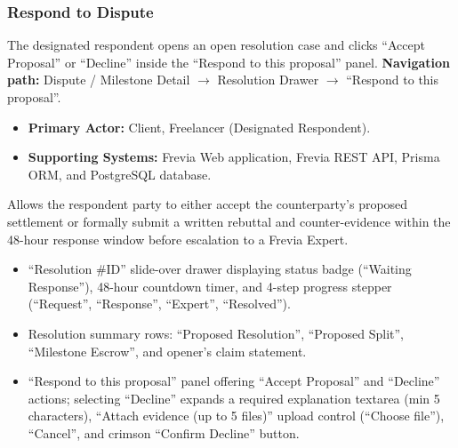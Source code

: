 \subsubsection{ Respond to Dispute}

The designated respondent opens an open resolution case and clicks ``Accept Proposal'' or ``Decline'' inside the ``Respond to this proposal'' panel.\newline
\textbf{Navigation path:} Dispute / Milestone Detail $\rightarrow$ Resolution Drawer $\rightarrow$ ``Respond to this proposal''.


\begin{itemize}[leftmargin=1.6em,topsep=3pt,itemsep=2pt,parsep=0pt,label=$\bullet$]
      \item \textbf{Primary Actor:} Client, Freelancer (Designated Respondent).
      \item \textbf{Supporting Systems:} Frevia Web application, Frevia REST API, Prisma ORM, and PostgreSQL database.
\end{itemize}

\noindent Allows the respondent party to either accept the counterparty's proposed settlement or formally submit a written rebuttal and counter-evidence within the 48-hour response window before escalation to a Frevia Expert.

\begin{itemize}[leftmargin=1.6em,topsep=3pt,itemsep=2pt,parsep=0pt,label=$\bullet$]
      \item ``Resolution \#ID'' slide-over drawer displaying status badge (``Waiting Response''), 48-hour countdown timer, and 4-step progress stepper (``Request'', ``Response'', ``Expert'', ``Resolved'').
      \item Resolution summary rows: ``Proposed Resolution'', ``Proposed Split'', ``Milestone Escrow'', and opener's claim statement.
      \item ``Respond to this proposal'' panel offering ``Accept Proposal'' and ``Decline'' actions; selecting ``Decline'' expands a required explanation textarea (min 5 characters), ``Attach evidence (up to 5 files)'' upload control (``Choose file''), ``Cancel'', and crimson ``Confirm Decline'' button.
\end{itemize}

